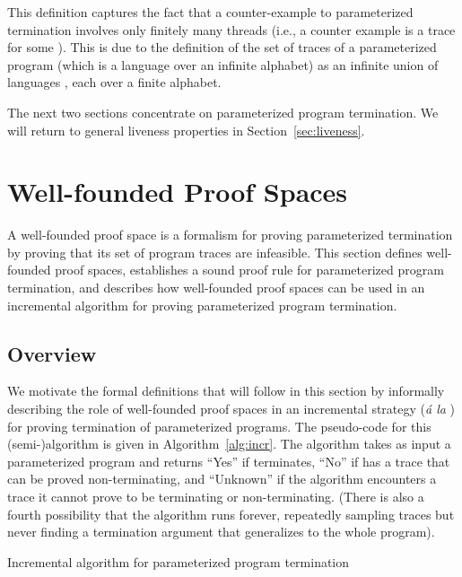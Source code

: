 \documentclass[9pt,nocopyrightspace]{sigplanconf}
\theoremstyle{definition}
\begin{document}
This definition captures the fact that a counter-example to parameterized termination involves only finitely many threads (i.e., a counter example is a trace  for some ).  
This is due to the definition of the set of traces of a parameterized program   (which is a language over an infinite alphabet) as an infinite union of languages , each over a finite alphabet.

The next two sections concentrate on parameterized program termination.  We will return to general liveness properties in Section~\ref{sec:liveness}.








\section{Well-founded Proof Spaces} \label{sec:proofspace}

A well-founded proof space is a formalism for proving parameterized
termination by proving that its set of program traces are infeasible.  This
section defines well-founded proof spaces, establishes a sound proof rule for
parameterized program termination, and describes how well-founded proof spaces
can be used in an incremental algorithm for proving parameterized program
termination.

\subsection{Overview}
We motivate the formal definitions that will follow in this section by
informally describing the role of well-founded proof spaces in an incremental
strategy (\emph{\'{a} la} \cite{Cook2005,pldi/CookPR06}) for proving
termination of parameterized programs.  The pseudo-code for this
(semi-)algorithm is given in Algorithm~\ref{alg:incr}.  The algorithm takes as
input a parameterized program  and returns ``Yes'' if  terminates,
``No'' if  has a trace that can be proved non-terminating, and ``Unknown''
if the algorithm encounters a trace it cannot prove to be terminating or
non-terminating.  (There is also a fourth possibility that the algorithm runs
forever, repeatedly sampling traces but never finding a termination argument that
generalizes to the whole program).

\begin{algorithm}
  \SetAlgoLined\DontPrintSemicolon
    

  
  \caption{Incremental algorithm for parameterized program termination \label{alg:incr}}
\end{algorithm}
\end{document}
